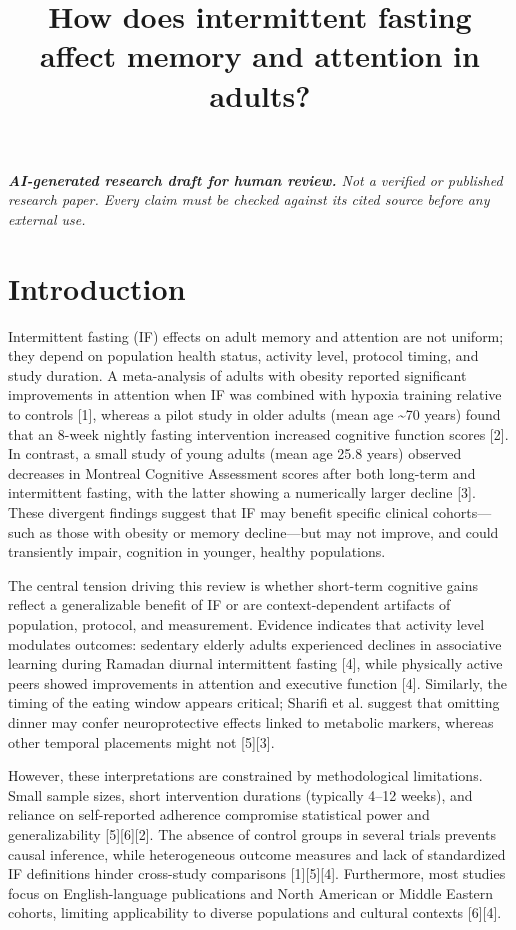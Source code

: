 \documentclass[conference]{IEEEtran}
\title{How does intermittent fasting affect memory and attention in adults?}
\author{\IEEEauthorblockN{ResearchGenie}\IEEEauthorblockA{AI-generated research draft}}
\begin{document}
\maketitle
\textit{\textbf{AI-generated research draft for human review.} Not a verified or published research paper. Every claim must be checked against its cited source before any external use.}\par

\section{Introduction}
Intermittent fasting (IF) effects on adult memory and attention are not uniform; they depend on population health status, activity level, protocol timing, and study duration. A meta-analysis of adults with obesity reported significant improvements in attention when IF was combined with hypoxia training relative to controls [1], whereas a pilot study in older adults (mean age \textasciitilde{}70 years) found that an 8-week nightly fasting intervention increased cognitive function scores [2]. In contrast, a small study of young adults (mean age 25.8 years) observed decreases in Montreal Cognitive Assessment scores after both long-term and intermittent fasting, with the latter showing a numerically larger decline [3]. These divergent findings suggest that IF may benefit specific clinical cohorts—such as those with obesity or memory decline—but may not improve, and could transiently impair, cognition in younger, healthy populations.

The central tension driving this review is whether short-term cognitive gains reflect a generalizable benefit of IF or are context-dependent artifacts of population, protocol, and measurement. Evidence indicates that activity level modulates outcomes: sedentary elderly adults experienced declines in associative learning during Ramadan diurnal intermittent fasting [4], while physically active peers showed improvements in attention and executive function [4]. Similarly, the timing of the eating window appears critical; Sharifi et al. suggest that omitting dinner may confer neuroprotective effects linked to metabolic markers, whereas other temporal placements might not [5][3].

However, these interpretations are constrained by methodological limitations. Small sample sizes, short intervention durations (typically 4–12 weeks), and reliance on self-reported adherence compromise statistical power and generalizability [5][6][2]. The absence of control groups in several trials prevents causal inference, while heterogeneous outcome measures and lack of standardized IF definitions hinder cross-study comparisons [1][5][4]. Furthermore, most studies focus on English-language publications and North American or Middle Eastern cohorts, limiting applicability to diverse populations and cultural contexts [6][4].
\end{document}

